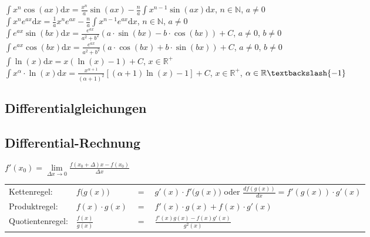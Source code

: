 	$\int x^n \cos(ax) \mathrm dx = \frac{x^n}{a} \sin(ax) - \frac{n}{a} \int
	x^{n-1} \sin(ax) \mathrm dx$, $n \in \mathbb N$, $a \neq 0$\\
	$\int x^n e^{ax} \mathrm dx = \frac{1}{a} x^n e^{ax} - \frac{n}{a} \int
	x^{n-1} e^{ax} \mathrm dx$, $n \in \mathbb N$, $a \neq 0$\\
	$\int e^{ax} \sin(bx) \mathrm dx = \frac{e^{ax}}{a^2 + b^2} (a \cdot \sin(bx) -
	b \cdot \cos(bx)) + C$, $a \neq 0$, $b \neq 0$ \\
	$\int e^{ax} \cos(bx) \mathrm dx = \frac{e^{ax}}{a^2 + b^2} (a \cdot \cos(bx) +
	b \cdot \sin(bx)) + C$, $a \neq 0$, $b \neq 0$ \\
	$\int \ln(x) \mathrm dx = x(\ln(x) - 1) + C$, $x \in \mathbb R^+$\\
	$\int x^\alpha \cdot \ln(x) \mathrm dx = \frac{x^{\alpha + 1}}{(\alpha + 1)^2}
	[(\alpha + 1) \ln(x) - 1] + C$, $x \in \mathbb R^+$, $\alpha \in \mathbb R
	\textbackslash \{-1\}$\\
	
			
	\subsection{Differentialgleichungen}
		
	\subsection{Differential-Rechnung}
	  $f'(x_0)=\lim\limits_{\Delta x\rightarrow 0}
	  \frac{f(x_0+\Delta)x-f(x_0)}{\Delta x}$\\
		\begin{tabular}{llll}
			Kettenregel:	& $f\big(g(x)\big)$ &$=$ & $g'(x)\cdot f'\big(g(x)\big)$
			oder $\frac{d f(g(x))}{dx} = f'(g(x)) \cdot g'(x)$\\[0.1cm] Produktregel:	&
			$f(x)\cdot g(x)$ &$=$ & $f'(x)\cdot g(x) + f(x)\cdot g'(x)$\\[0.1cm] Quotientenregel:& $\frac{f(x)}{g(x)}$ &$=$ & $\frac{f'(x)g(x)-f(x)g'(x)}{g^2(x)}$\\
		\end{tabular}
		
